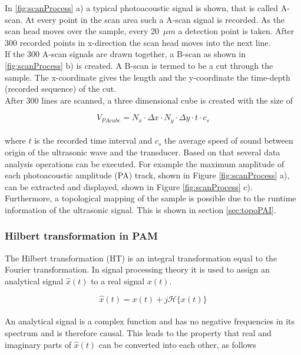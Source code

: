 In \ref{fig:scanProcess} a) a typical photoacoustic signal is shown, that is called A-scan. At every point in the scan area such a A-scan signal is recorded. As the scan head moves over the sample, every 20~$\mu m$ a detection point is taken. After 300 recorded points in x-direction the scan head moves into the next line. \\
If the 300 A-scan signals are drawn together, a B-scan as shown in \ref{fig:scanProcess} b) is created. A B-scan is termed to be a cut through the sample. The x-coordinate gives the length and the y-coordinate the time-depth (recorded sequence) of the cut.\\
After 300 lines are scanned, a three dimensional cube is created with the size of 

\begin{equation}
	V_{PAcube} = N_x \cdot \Delta x \cdot N_y \cdot \Delta y \cdot t \cdot c_s
\end{equation}
\\
where $t$ is the recorded time interval and $c_s$ the average speed of sound between origin of the ultrasonic wave and the transducer. Based on that several data analysis operations can be executed. For example the maximum amplitude of each photoacoustic amplitude (PA) track, shown in Figure \ref{fig:scanProcess} a), can be extracted and displayed, shown in Figure \ref{fig:scanProcess} c).\\
Furthermore, a topological mapping of the sample is possible due to the runtime information of the ultrasonic signal. This is shown in section \ref{sec:topoPAI}. 

\subsubsection{Hilbert transformation in PAM}

The Hilbert transformation (HT) is an integral transformation equal to the Fourier transformation. In signal processing theory it is used to assign an analytical signal $\hat{x}(t)$ to a real signal $x(t)$. 

\begin{equation}
\hat{x}(t)= x(t) + j \mathcal{H}\{x(t)\}
\end{equation}
\\
An analytical signal is a complex function and has no negative frequencies in its spectrum and is therefore causal. This leads to the property that real and imaginary parts of $\hat{x}(t)$ can be converted into each other, as follows

